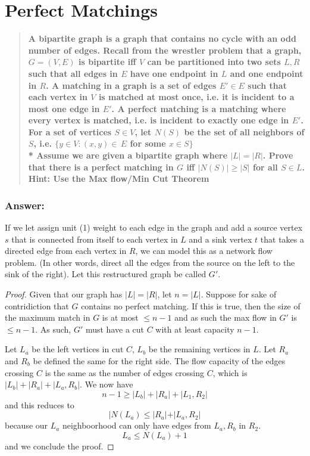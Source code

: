 \documentclass[titlepage]{article}\usepackage[]{graphicx}\usepackage[]{color}
\begin{document}
\section{Perfect Matchings}
  \begin{quote}
      \textbf{A bipartite graph is a graph that contains no cycle with an odd
      number of edges. Recall from the wrestler problem that a graph, $G = (V,
      E)$ is
    bipartite iff $V$ can be partitioned into two sets $L, R$ such that all
    edges in $E$
    have one endpoint in $L$ and one endpoint in $R$. A matching in a graph is a set of
    edges $E' \in E$ such that each vertex in $V$ is matched at most once, i.e. it is
    incident to a most one edge in $E'$. A perfect matching is a matching where every
    vertex is matched, i.e. is incident to exactly one edge in $E'$. For a set of
    vertices $S \in V$, let $N(S)$ be the set of all neighbors of $S$, i.e. $\{y
    \in V : (x,y) \in \, E $ for some $x \in S\}$ \\*
    Assume we are given a bipartite graph where $|L| = |R|$. Prove that there is a
    perfect matching in $G$ iff $|N(S)| \geq |S|$ for all $S \in L$.
    Hint: Use the Max flow/Min Cut Theorem}
  \end{quote}
  \subsubsection{Answer:}
    If we let assign unit (1) weight to each edge in the graph and add a source
    vertex $s$ that is connected from itself to each vertex in $L$ and a sink vertex $t$
    that takes a directed edge from each vertex in $R$, we can model this as a
    network flow problem. (In other words, direct all the edges from the source
    on the left to the sink of the right). Let this restructured graph be
    called $G'$. 
  \begin{proof}
    Given that our graph has $|L| = |R|$, let $n = |L|$. 
    Suppose for sake of contridiction that $G$ contains no perfect matching. If
    this is true, then the size of the maximum match in $G$ is at most $\leq n
    -1$ and as such the max flow in $G'$ is $\leq n-1$. As such, $G'$ must have
    a cut $C$ with at least capacity $n-1$. 

    Let $L_a$ be the left vertices in cut $C$, $L_b$ be the remaining vertices
    in $L$. Let $R_a$ and $R_b$ be defined the same for the right side. The
    flow capacity of the edges crossing $C$ is the same as the number of edges
    crossing $C$, which is $|L_b| + |R_a| + |L_a,R_b|$. 
    We now have 
    \[n-1 \geq |L_b| + |R_a| + |L_1, R_2|\]
    and this reduces to 
    \[ |N(L_a) \leq |R_a| + |L_a,R_2| \] because our $L_a$ neighboorhood can
    only have edges from $L_a, R_b$ in $R_2$. 
    \[ L_a \leq N(L_a) + 1 \] and we conclude the proof.
  \end{proof}
\end{document}
